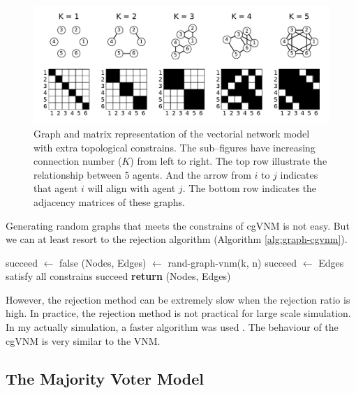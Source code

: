 \documentclass[11pt,twoside]{report}
\begin{document}
\begin{figure}
  \includegraphics[width=\linewidth]{graph-regular}
  \caption{Graph and matrix representation of the vectorial network model with extra topological constrains. The sub--figures have increasing connection number ($K$) from left to right. The top row illustrate the relationship between 5 agents. And the arrow from $i$ to $j$ indicates that agent $i$ will align with agent $j$. The bottom row indicates the adjacency matrices of these graphs. }
  \label{fig:graph-regular}
\end{figure}

Generating random graphs that meets the constrains of cgVNM is not easy. But we can at least resort to the rejection algorithm (Algorithm \ref{alg:graph-cgvnm}).

\begin{tcolorbox}[
title=Rejection Algorithm to generate graphs with constrains,
enlarge bottom by=0.5em,
enlarge top by=0.5em,
]

\label{alg:graph-cgvnm}
\begin{algorithmic}

\State succeed $\gets$ false
\Repeat
	\State (Nodes, Edges) $\gets$ rand-graph-vnm(k, n)
	\State succeed $\gets$ Edges satisfy all constrains
\Until succeed
\State \textbf{return} (Nodes, Edges)
\EndProcedure
\end{algorithmic}
\end{tcolorbox}

\noindent However, the rejection method can be extremely slow when the rejection ratio is high. In practice, the rejection method is not practical for large scale simulation. In my actually simulation, a faster algorithm was used \cite{kim2003book}. The behaviour of the cgVNM is very similar to the VNM.

\subsection{The Majority Voter Model}
\end{document}
